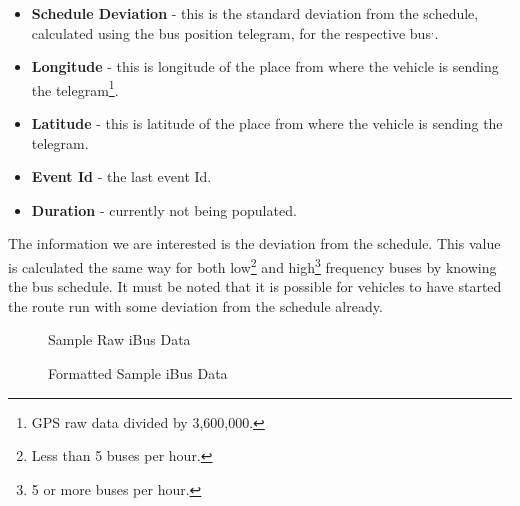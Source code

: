 \begin{itemize}
	\item \textbf{Schedule Deviation} - this is the standard deviation from the schedule, calculated using the bus position telegram, for the respective bus\footnotemark[\ref{loggedProperly}]$^{,}$\footnotemark[\ref{routeVariant}].
	\item \textbf{Longitude} - this is longitude of the place from where the vehicle is sending the telegram\footnote{\label{gps}GPS raw data divided by 3,600,000.}.
	\item \textbf{Latitude} - this is latitude of the place from where the vehicle is sending the telegram\footnotemark[\ref{gps}].
	\item \textbf{Event Id} - the last event Id.
	\item \textbf{Duration} - currently not being populated.
\end{itemize}

The information we are interested is the deviation from the schedule. This value is calculated the same way for both low\footnote{Less than 5 buses per hour.} and high\footnote{5 or more buses per hour.} frequency buses by knowing the bus schedule. It must be noted that it is possible for vehicles to have started the route run with some deviation from the schedule already.

\begin{figure}[ht!]
	\caption{Sample Raw iBus Data}
\label{fig:rawDataSample}
\end{figure}

\begin{figure}[ht!]
	\caption{Formatted Sample iBus Data}
\label{fig:formattedDataSample}
\end{figure}

\FloatBarrier
